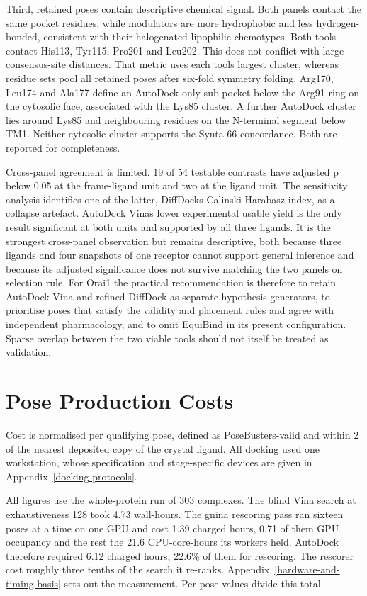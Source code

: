 Third, retained poses contain descriptive chemical signal. Both panels contact the same pocket residues, while modulators are more hydrophobic and less hydrogen-bonded, consistent with their halogenated lipophilic chemotypes. Both tools contact His113, Tyr115, Pro201 and Leu202. This does not conflict with large consensus-site distances. That metric uses each tool\textquotesingle s largest cluster, whereas residue sets pool all retained poses after six-fold symmetry folding. Arg170, Leu174 and Ala177 define an AutoDock-only sub-pocket below the Arg91 ring on the cytosolic face, associated with the Lys85 cluster. A further AutoDock cluster lies around Lys85 and neighbouring residues on the N-terminal segment below TM1. Neither cytosolic cluster supports the Synta-66 concordance. Both are reported for completeness.

Cross-panel agreement is limited. 19 of 54 testable contrasts have adjusted p below 0.05 at the frame-ligand unit and two at the ligand unit. The sensitivity analysis identifies one of the latter, DiffDock\textquotesingle s Calinski-Harabasz index, as a collapse artefact. AutoDock Vina\textquotesingle s lower experimental usable yield is the only result significant at both units and supported by all three ligands. It is the strongest cross-panel observation but remains descriptive, both because three ligands and four snapshots of one receptor cannot support general inference and because its adjusted significance does not survive matching the two panels on selection rule. For Orai1 the practical recommendation is therefore to retain AutoDock Vina and refined DiffDock as separate hypothesis generators, to prioritise poses that satisfy the validity and placement rules and agree with independent pharmacology, and to omit EquiBind in its present configuration. Sparse overlap between the two viable tools should not itself be treated as validation.

\hypertarget{pose-production-costs}{%
\section{Pose Production Costs}\label{pose-production-costs}}

Cost is normalised per qualifying pose, defined as PoseBusters-valid and within 2\angstrom{} of the nearest deposited copy of the crystal ligand. All docking used one workstation, whose specification and stage-specific devices are given in Appendix~\ref{docking-protocols}.

All figures use the whole-protein run of 303 complexes. The blind Vina search at exhaustiveness 128 took 4.73 wall-hours. The gnina rescoring pass ran sixteen poses at a time on one GPU and cost 1.39 charged hours, 0.71 of them GPU occupancy and the rest the 21.6 CPU-core-hours its workers held. AutoDock therefore required 6.12 charged hours, 22.6\% of them for rescoring. The rescorer cost roughly three tenths of the search it re-ranks. Appendix~\ref{hardware-and-timing-basis} sets out the measurement. Per-pose values divide this total.

